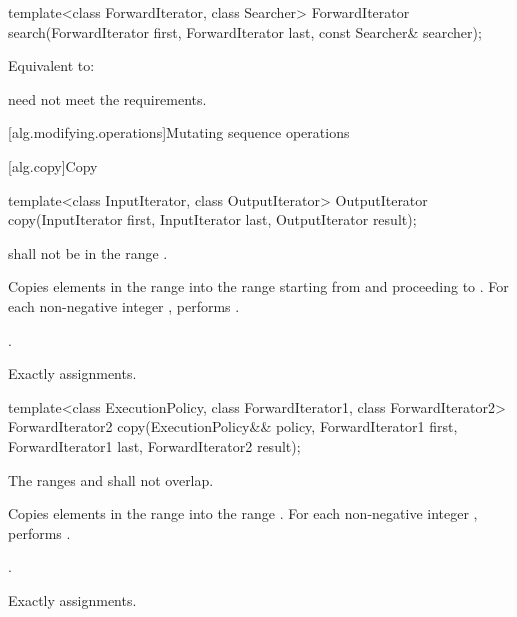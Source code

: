 %
\begin{itemdecl}
template<class ForwardIterator, class Searcher>
  ForwardIterator search(ForwardIterator first, ForwardIterator last,
                         const Searcher& searcher);
\end{itemdecl}

\begin{itemdescr}
\pnum
\effects
Equivalent to: 

\pnum
\remarks
{} need not meet the  requirements.
\end{itemdescr}


[alg.modifying.operations]{Mutating sequence operations}

[alg.copy]{Copy}

%
\begin{itemdecl}
template<class InputIterator, class OutputIterator>
  OutputIterator copy(InputIterator first, InputIterator last,
                      OutputIterator result);
\end{itemdecl}

\begin{itemdescr}
\pnum
\requires {} shall not be in the range .

\pnum
\effects Copies elements in the range  into the range  starting from  and proceeding to . For each non-negative integer , performs .

\pnum
\returns {}.

\pnum
\complexity Exactly  assignments.
\end{itemdescr}

%
\begin{itemdecl}
template<class ExecutionPolicy, class ForwardIterator1, class ForwardIterator2>
  ForwardIterator2 copy(ExecutionPolicy&& policy,
                        ForwardIterator1 first, ForwardIterator1 last,
                        ForwardIterator2 result);
\end{itemdecl}

\begin{itemdescr}
\pnum
\requires The ranges  and
 shall not overlap.

\pnum
\effects Copies elements in the range  into
the range .
For each non-negative integer ,
performs .

\pnum
\returns {}.

\pnum
\complexity Exactly  assignments.
\end{itemdescr}


